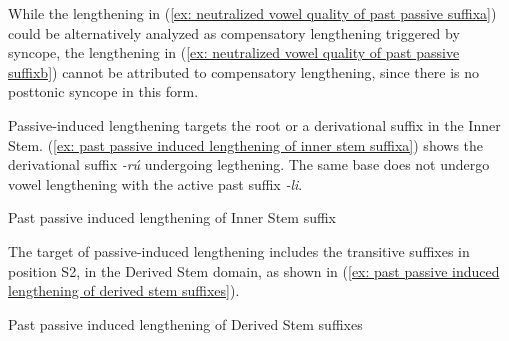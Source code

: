While the lengthening in (\ref{ex: neutralized vowel quality of past passive suffixa}) could be alternatively analyzed as compensatory lengthening triggered by syncope, the lengthening in (\ref{ex: neutralized vowel quality of past passive suffixb}) cannot be attributed to compensatory lengthening, since there is no posttonic syncope in this form.

Passive-induced lengthening targets the root or a derivational suffix in the Inner Stem. (\ref{ex: past passive induced lengthening of inner stem suffixa}) shows the derivational suffix \textit{-rú} undergoing legthening. The same base does not undergo vowel lengthening with the active past suffix \textit{-li}.


\ea\label{ex: past passive induced lengthening of inner stem suffix}
Past passive induced lengthening of Inner Stem suffix

    \label{ex: past passive induced lengthening of inner stem suffixa}
        \label{ex: past passive induced lengthening of inner stem suffixb}
    \z
\z

The target of passive-induced lengthening includes the transitive suffixes in position S2, in the Derived Stem domain, as shown in (\ref{ex: past passive induced lengthening of derived stem suffixes}).

\ea\label{ex: past passive induced lengthening of derived stem suffixes}
{Past passive induced lengthening of Derived Stem suffixes}

